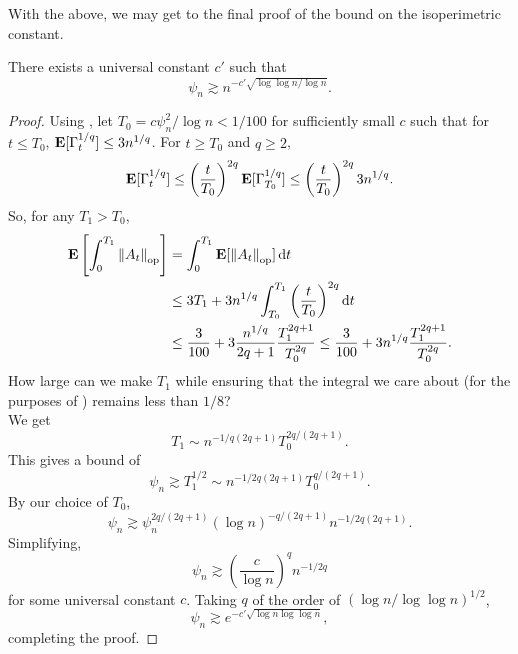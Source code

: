 \documentclass{article}
\begin{document}
		With the above, we may get to the final proof of the bound on the isoperimetric constant.

		\begin{ftheo}
			There exists a universal constant $c'$ such that
			\[ \psi_n \gtrsim n^{-c'\sqrt{\log \log n / \log n}}. \]
		\end{ftheo}
		\begin{proof}
			Using  , let $T_0 = c \psi_n^2 / \log n < 1 / 100$ for sufficiently small $c$ such that for $t\leq T_0$, $\textbf{E}[\Gamma_t^{1/q}] \leq 3n^{1/q}$. For $t \geq T_0$ and $q \geq 2$,
			\[ \textbf{E}[\Gamma_t^{1/q}] \leq \left(\frac{t}{T_0}\right)^{2q} \textbf{E}[\Gamma_{T_0}^{1/q}] \leq \left(\frac{t}{T_0}\right)^{2q} 3n^{1/q}. \]
			So, for any $T_1 > T_0$,
			\begin{align*}
				\textbf{E}\left[ \int_0^{T_1} \left\lVert A_t\right\rVert_{\text{op}} \right] &= \int_0^{T_1} \textbf{E}[\left\lVert A_t\right\rVert_{\text{op}}] \operatorname{d}\!{t} \\
					&\leq 3T_1 + 3n^{1/q} \int_{T_0}^{T_1} \left(\frac{t}{T_0}\right)^{2q} \operatorname{d}\!{t} \\
					&\leq \frac{3}{100} + 3 \frac{ n^{1/q} }{2q+1} \frac{T_1^{2q+1}}{T_0^{2q}} \leq \frac{3}{100} + 3 n^{1/q} \frac{T_1^{2q+1}}{T_0^{2q}}.
			\end{align*}
			How large can we make $T_1$ while ensuring that the integral we care about (for the purposes of ) remains less than $1/8$?\\
			We get
			\[ T_1 \sim n^{-1/q(2q+1)} T_0^{2q/(2q+1)}. \]
			This gives a bound of
			\[ \psi_n \gtrsim T_1^{1/2} \sim n^{-1/2q(2q+1)} T_0^{q/(2q+1)}. \]
			By our choice of $T_0$,
			\[ \psi_n \gtrsim \psi_n^{2q/(2q+1)} (\log n)^{-q/(2q+1)} n^{-1/2q(2q+1)}. \]
			Simplifying,
			\[ \psi_n \gtrsim \left(\frac{c}{\log n}\right)^{q} n^{-1/2q} \]
			for some universal constant $c$. Taking $q$ of the order of $\left(\log n / \log \log n\right)^{1/2}$,
			\[ \psi_n \gtrsim e^{-c' \sqrt{\log n \log \log n} }, \]
			completing the proof.
		\end{proof}


\end{document}
